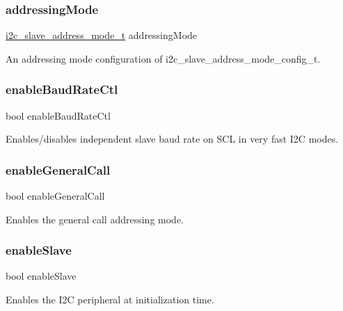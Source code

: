 \subsubsection{\texorpdfstring{addressingMode}{addressingMode}}
{\footnotesize\ttfamily \mbox{\hyperlink{group__i2c__driver_ga70379ff75d2f4591b8dc1ba107a2a606}{i2c\+\_\+slave\+\_\+address\+\_\+mode\+\_\+t}} addressing\+Mode}

An addressing mode configuration of i2c\+\_\+slave\+\_\+address\+\_\+mode\+\_\+config\+\_\+t. \mbox{\label{struct__i2c__slave__config_a788ff5c58438afe177059bf0d3c78d5a}} 
\subsubsection{\texorpdfstring{enableBaudRateCtl}{enableBaudRateCtl}}
{\footnotesize\ttfamily bool enable\+Baud\+Rate\+Ctl}

Enables/disables independent slave baud rate on S\+CL in very fast I2C modes. \mbox{\label{struct__i2c__slave__config_aedb9cfa838d8a677d9193d5c92298ea4}} 
\subsubsection{\texorpdfstring{enableGeneralCall}{enableGeneralCall}}
{\footnotesize\ttfamily bool enable\+General\+Call}

Enables the general call addressing mode. \mbox{\label{struct__i2c__slave__config_a9189d8f6438ba99548837da162213c46}} 
\subsubsection{\texorpdfstring{enableSlave}{enableSlave}}
{\footnotesize\ttfamily bool enable\+Slave}

Enables the I2C peripheral at initialization time. \mbox{\label{struct__i2c__slave__config_af1f3df39054da492f1da50ca792676af}} 

